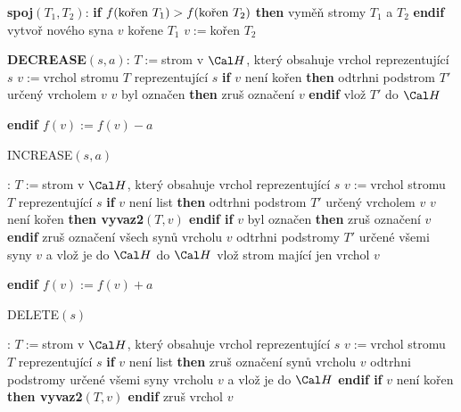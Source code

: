 \documentclass[a4paper,12pt]{article}
\begin{document}
{\bf spoj$(T_1,T_2)$}:\newline 
{\bf if} $f(\text{\rm kořen }T_1)>f(\text{\rm kořen }T_2)$ {\bf then\newline 
\phantom{{\rm{\rm ---}}}}vyměň stromy $T_1$ a $T_2$\newline 
{\bf endif\newline 
}
vytvoř nového syna $v$ kořene $T_1$\newline 
$v:=$kořen $T_2$

{\bf DECREASE$(s,a)$}:\newline 
$T:=$strom v $\Cal H$, který obsahuje vrchol reprezentující $
s$\newline 
$v:=$vrchol stromu $T$ reprezentující $s$\newline 
{\bf if} $v$ není kořen {\bf then \newline 
\phantom{{\rm ---}}}odtrhni podstrom $T'$ určený vrcholem $v$\newline 
{} $v$ byl označen {\bf then} zruš označení $
v$ {\bf endif\newline 
\phantom{{\rm ---}}}vlož $T'$ do $\Cal H$\newline 
{\bf endif\newline 
$f(v):=f(v)-a$

INCREASE$(s,a)$}:\newline 
$T:=$strom v $\Cal H$, který obsahuje vrchol reprezentující $
s$\newline 
$v:=$vrchol stromu $T$ reprezentující $s$\newline 
{\bf if} $v$ není list {\bf then \newline 
\phantom{{\rm ---}}}odtrhni podstrom $T'$ určený vrcholem $v$\newline 
\phantom{---}{\bf if} $v$ není kořen {\bf then vyvaz2$(T,v
)$ endif\newline 
\phantom{{\rm ---}}if} $v$ byl označen {\bf then} zruš označení $
v$ {\bf endif\newline 
\phantom{{\rm ---}}}zruš označení všech synů vrcholu $
v$\newline 
\phantom{---}odtrhni podstromy $T'$ určené všemi syny $v$ 
a vlož je do $\Cal H$\newline 
\phantom{{\bf ---}}do $\Cal H$ vlož strom mající jen vrchol $
v$\newline 
{\bf endif\newline 
$f(v):=f(v)+a$

DELETE$(s)$}:\newline 
$T:=$strom v $\Cal H$, který obsahuje vrchol reprezentující $
s$\newline 
$v:=$vrchol stromu $T$ reprezentující $s$\newline 
{\bf if} $v$ není list {\bf then\newline 
\phantom{{\rm ---}}}zruš označení synů vrcholu $
v$\newline 
\phantom{---}odtrhni podstromy určené všemi syny 
vrcholu $v$ a vlož je do $\Cal H$\newline 
{\bf endif\newline 
if} $v$ není kořen {\bf then vyvaz2$(T,v)$ endif\newline 
}
zruš vrchol $v$
\end{document}
